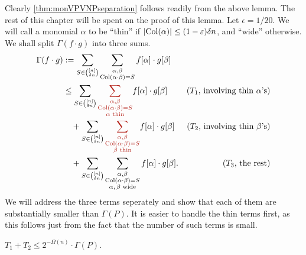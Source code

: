 Clearly \autoref{thm:monVPVNPseparation} follows readily from the above lemma.
The rest of this chapter will be spent on the proof of this lemma.
Let $\epsilon = 1/20$. We will call a monomial $\alpha$ to be ``thin'' if $\left|\operatorname{Col}(\alpha)\right| \leq (1-\varepsilon) \delta n$, and ``wide'' otherwise. 
We shall split $\Gamma(f \cdot g)$ into three sums.
\begin{align*}
  \Gamma(f \cdot g) & :=   \sum_{S \in \binom{[n]}{\delta n}} \sum_{\substack{\alpha, \beta\\ \Col(\alpha \cdot \beta) = S}} f[\alpha] \cdot g[\beta]\\
                    & \leq \sum_{S \in \binom{[n]}{\delta n}} \textcolor{BrickRed}{\sum_{\substack{\alpha, \beta\\ \Col(\alpha \cdot \beta) = S \\ \text{$\alpha$ thin}}}} f[\alpha] \cdot g[\beta] & \text{($T_1$, involving thin $\alpha$'s)}\\
                    & \quad + \sum_{S \in \binom{[n]}{\delta n}} \textcolor{BrickRed}{\sum_{\substack{\alpha, \beta\\ \Col(\alpha \cdot \beta) = S \\ \text{$\beta$ thin}}}} f[\alpha] \cdot g[\beta] & \text{($T_2$, involving thin $\beta$'s)}\\
                    & \quad + \sum_{S \in \binom{[n]}{\delta n}} \sum_{\substack{\alpha, \beta\\ \Col(\alpha \cdot \beta) = S \\ \text{$\alpha,\beta$ wide}}} f[\alpha] \cdot g[\beta]. & \text{($T_3$, the rest)}                                                           
\end{align*}
We will address the three terms seperately and show that each of them are substantially smaller than $\Gamma(P)$.
It is easier to handle the thin terms first, as this follows just from the fact that the number of such terms is small.
\begin{claim}
  $T_1 + T_2 \leq 2^{-\Omega(n)} \cdot \Gamma(P)$. 
\end{claim}
